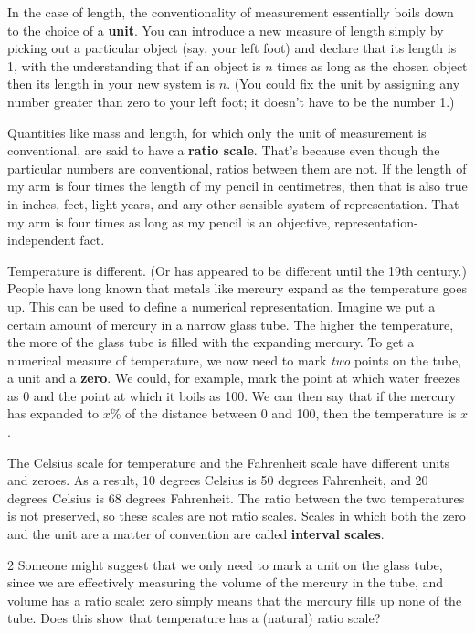 In the case of length, the conventionality of measurement essentially boils down
to the choice of a \textbf{unit}. You can introduce a new measure of length
simply by picking out a particular object (say, your left foot) and declare that
its length is 1, with the understanding that if an object is $n$ times as long
as the chosen object then its length in your new system is $n$. (You could fix
the unit by assigning any number greater than zero to your left foot; it doesn't
have to be the number 1.)

Quantities like mass and length, for which only the unit of measurement is
conventional, are said to have a \textbf{ratio scale}. That's because even though the
particular numbers are conventional, ratios between them are not. If the length
of my arm is four times the length of my pencil in centimetres, then that is
also true in inches, feet, light years, and any other sensible system of
representation. That my arm is four times as long as my pencil is an objective,
representation-independent fact.

Temperature is different. (Or has appeared to be different until the 19th
century.) People have long known that metals like mercury expand as the
temperature goes up. This can be used to define a numerical representation.
Imagine we put a certain amount of mercury in a narrow glass tube. The higher
the temperature, the more of the glass tube is filled with the expanding
mercury. To get a numerical measure of temperature, we now need to mark
\emph{two} points on the tube, a unit and a \textbf{zero}. We could, for
example, mark the point at which water freezes as 0 and the point at which it
boils as 100. We can then say that if the mercury has expanded to $x\%$ of the
distance between 0 and 100, then the temperature is $x$.

The Celsius scale for temperature and the Fahrenheit scale have different units
and zeroes. As a result, 10 degrees Celsius is 50 degrees Fahrenheit, and 20
degrees Celsius is 68 degrees Fahrenheit. The ratio between the two temperatures
is not preserved, so these scales are not ratio scales. Scales in which both the
zero and the unit are a matter of convention are called \textbf{interval
  scales}.

\begin{exercise}{2}
  Someone might suggest that we only need to mark a unit on the glass tube,
  since we are effectively measuring the volume of the mercury in the tube, and
  volume has a ratio scale: zero simply means that the mercury fills up none of
  the tube. Does this show that temperature has a (natural) ratio scale?
\end{exercise}

